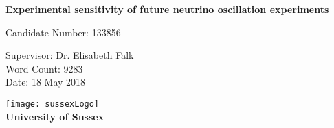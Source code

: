 \begin{titlepage}
\begin{center}

\vspace*{4cm} %
        
	{\Large\textbf{Experimental sensitivity of future neutrino oscillation experiments}}
        
\vspace{1cm} %
      

{\large Candidate Number: 133856

Supervisor: Dr. Elisabeth Falk\\

Word Count: 9283\\

	Date: 18 May 2018\\
        
}

\vspace{8cm} %

\texttt{[image: sussexLogo]}\\

{\Large\textbf{University of Sussex}}
\end{center}
\end{titlepage}
